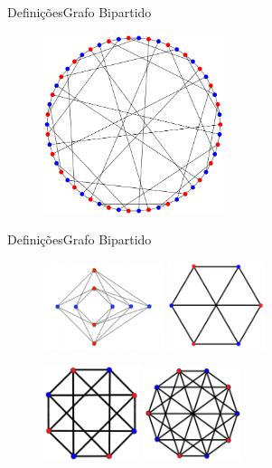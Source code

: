 \documentclass[aspectratio=169]{beamer}
\begin{document}
\begin{frame}{Definições}{Grafo Bipartido}
\begin{figure}[!h]
  \centering
  \includegraphics[width=150pt]{imagens/exemplo_grafo_bipartido2.png}
  \label{fig_exemplo_grafo_bipartido2}
\end{figure}
\end{frame}


\begin{frame}{Definições}{Grafo Bipartido}
\begin{figure}[!h]
  \centering
  \includegraphics[width=100pt]{imagens/exemplo_grafo_bipartido3.jpg}
  \includegraphics[width=80pt]{imagens/exemplo_grafo_bipartido4.png}
  \label{fig_exemplo_grafo_bipartido4}
\end{figure}
\begin{figure}[!h]
  \centering
  \includegraphics[width=80pt]{imagens/exemplo_grafo_bipartido5.png}
  \includegraphics[width=80pt]{imagens/exemplo_grafo_bipartido6.png}
  \label{fig_exemplo_grafo_bipartido5}
\end{figure}
\end{frame}
\end{document}
